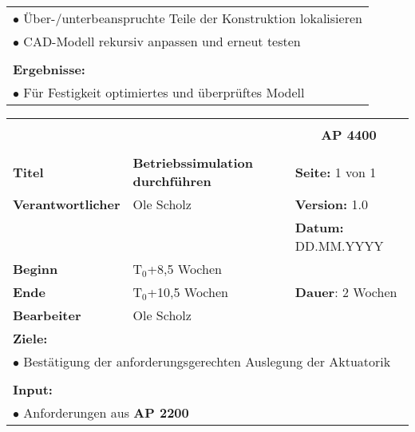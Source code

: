 \begin{table}[!h]
\begin{center}
\begin{tabular}{|p{35mm}||p{55mm}|p{50mm}||p{40mm}|}
			\multicolumn{4}{|p{150mm}|}{$\bullet$ Über-/unterbeanspruchte Teile der Konstruktion lokalisieren}\\
			\multicolumn{4}{|p{150mm}|}{$\bullet$ CAD-Modell rekursiv anpassen und erneut testen}\\
			\multicolumn{4}{|p{150mm}|}{}\\
			\multicolumn{4}{|p{150mm}|}{\textbf{Ergebnisse:}}\\
			\multicolumn{4}{|p{150mm}|}{$\bullet$ Für Festigkeit optimiertes und überprüftes Modell}\\
			\hline
		\end{tabular}
	\end{center}
\end{table}

\clearpage
\begin{table}[!h]
	\begin{center}
		\begin{tabular}{|p{35mm}||p{55mm}|p{50mm}||p{40mm}|}
			\hline
			\multicolumn{3}{|l||}{\textbf{}} & \multicolumn{1}{c|}{}\\
			\multicolumn{3}{|l||}{\textbf{}} & \multicolumn{1}{c|}{\textbf{AP 4400}}\\
			\multicolumn{3}{|l||}{\textbf{}} & \multicolumn{1}{c|}{}\\
			\hline\hline
			\textbf{Titel} & \multicolumn{2}{p{7cm}||}{\textbf{Betriebssimulation durchführen}} 
			& \textbf{Seite:} 1 von 1\\
			\hline
			\textbf{Verantwortlicher} & \multicolumn{2}{l||}{Ole Scholz} & \textbf{Version:} 1.0\\
			\hline
			\multicolumn{3}{|l||}{} & \textbf{Datum:} DD.MM.YYYY\\
			\hline\hline
			\textbf{Beginn} & \multicolumn{2}{l||}{T$_0$+8,5 Wochen} & \\
			\hline
			\textbf{Ende} & \multicolumn{2}{l||}{T$_0$+10,5 Wochen} & \textbf{Dauer}: 2 Wochen\\
			\hline\hline
			\textbf{Bearbeiter} & \multicolumn{3}{l|}{Ole Scholz}\\
			\hline\hline
			\multicolumn{4}{|p{150mm}|}{\textbf{Ziele:}}\\
			\multicolumn{4}{|p{150mm}|}{$\bullet$ Bestätigung der anforderungsgerechten Auslegung der Aktuatorik}\\
			\multicolumn{4}{|p{150mm}|}{}\\
			\multicolumn{4}{|p{150mm}|}{\textbf{Input:}}\\
			\multicolumn{4}{|p{150mm}|}{$\bullet$ Anforderungen aus \textbf{AP 2200}}\\

\end{tabular}
\end{center}
\end{table}
